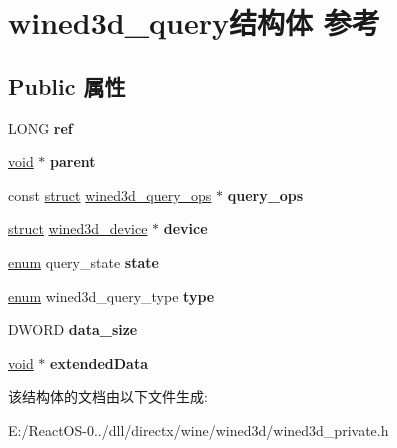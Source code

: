 \hypertarget{structwined3d__query}{}\section{wined3d\+\_\+query结构体 参考}
\label{structwined3d__query}
\subsection*{Public 属性}
\begin{DoxyCompactItemize}
\item 
\mbox{\label{structwined3d__query_a901f03baa9dab53ddbffa937596e6d85}} 
L\+O\+NG {\bfseries ref}
\item 
\mbox{\label{structwined3d__query_a90aa06e5dac49460f9a26a2a6d88d9dd}} 
\hyperlink{interfacevoid}{void} $\ast$ {\bfseries parent}
\item 
\mbox{\label{structwined3d__query_a59ab89f1aa231fa1c1788474ec87fbbb}} 
const \hyperlink{interfacestruct}{struct} \hyperlink{structwined3d__query__ops}{wined3d\+\_\+query\+\_\+ops} $\ast$ {\bfseries query\+\_\+ops}
\item 
\mbox{\label{structwined3d__query_a8181863a21dc5785f270142343a0d00d}} 
\hyperlink{interfacestruct}{struct} \hyperlink{structwined3d__device}{wined3d\+\_\+device} $\ast$ {\bfseries device}
\item 
\mbox{\label{structwined3d__query_ab12161447bbafa19efe1149423cdddc1}} 
\hyperlink{interfaceenum}{enum} query\+\_\+state {\bfseries state}
\item 
\mbox{\label{structwined3d__query_a8d63e2d4630fc68b966b972b9954d0f8}} 
\hyperlink{interfaceenum}{enum} wined3d\+\_\+query\+\_\+type {\bfseries type}
\item 
\mbox{\label{structwined3d__query_a05daf6a19b592a53caa7c82e7ddfb744}} 
D\+W\+O\+RD {\bfseries data\+\_\+size}
\item 
\mbox{\label{structwined3d__query_ad06c20233efe496702f865fbee4cf632}} 
\hyperlink{interfacevoid}{void} $\ast$ {\bfseries extended\+Data}
\end{DoxyCompactItemize}


该结构体的文档由以下文件生成\+:\begin{DoxyCompactItemize}
\item 
E\+:/\+React\+O\+S-\/0../dll/directx/wine/wined3d/wined3d\+\_\+private.\+h\end{DoxyCompactItemize}
